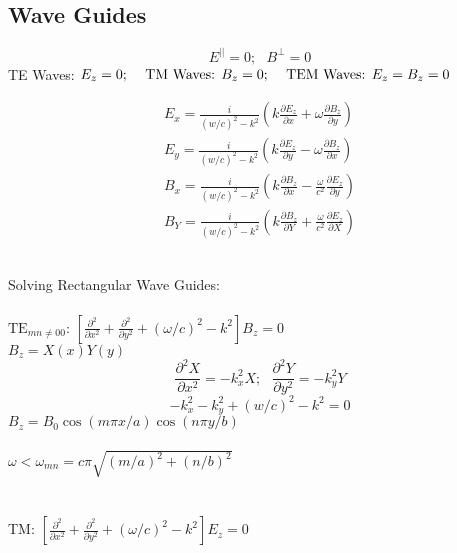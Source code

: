 \documentclass[12pt]{article}
\begin{document}
\subsection{Wave Guides}
\[E^{||} = 0; \ \ \ B^{\perp} = 0\]
TE Waves: \( E_z = 0;\ \ \ $ TM Waves: $B_z = 0;\ \ \ $ TEM Waves: $E_z = B_z = 0 \)

\begin{align*}
E_x = \frac{i}{ (w/c)^2 - k^2 } \left( k\frac{\partial E_z}{\partial x} + \omega\frac{\partial B_z}{\partial y} \right) \\
E_y = \frac{i}{ (w/c)^2 - k^2 } \left( k\frac{\partial E_z}{\partial y} - \omega\frac{\partial B_z}{\partial x} \right) \\
B_x = \frac{i}{ (w/c)^2 - k^2 } \left( k\frac{\partial B_z}{\partial x} - \frac{\omega}{c^2} \frac{\partial E_z}{\partial y} \right) \\
B_Y = \frac{i}{ (w/c)^2 - k^2 } \left( k\frac{\partial B_z}{\partial Y} + \frac{\omega}{c^2} \frac{\partial E_z}{\partial X} \right)
\end{align*}

\hfill \break \\
Solving Rectangular Wave Guides: \\ \\
\( \text{TE}_{mn \neq 00} \): 
\( \displaystyle \left[ \frac{\partial^2}{\partial x^2} 
	+ \frac{\partial^2}{\partial y^2} + (\omega / c)^2 -k^2 \right] B_z = 0 \) \\

$B_z = X(x)Y(y)$\\
\[ \frac{\partial^2 X}{\partial x^2} = -k_x^2 X;\ \ \ \frac{\partial^2 Y}{\partial y^2} = -k_y^2 Y\]
\[ -k_x^2 - k_y^2 + (w/c)^2 -k^2 = 0\] 
$B_z = B_0\cos(m\pi x/a)\cos(n\pi y/b)$ \\ \\
$\omega < \omega_{mn} = c\pi \sqrt{ (m/a)^2 + (n/b)^2 }$ \\ \\ \\
TM: \( \displaystyle \left[ \frac{\partial^2}{\partial x^2} 
	+ \frac{\partial^2}{\partial y^2} + (\omega / c)^2 -k^2 \right] E_z = 0 \)

\newpage
\end{document}
